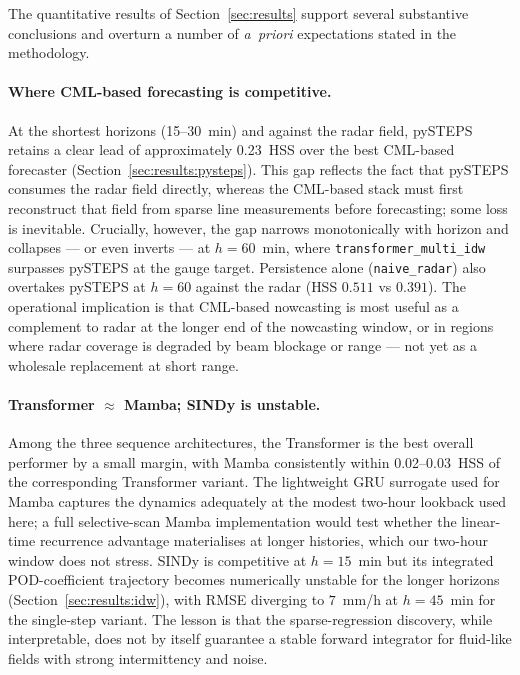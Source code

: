 \documentclass[12pt, a4paper]{article}
\begin{document}
The quantitative results of Section~\ref{sec:results} support several
substantive conclusions and overturn a number of \emph{a~priori}
expectations stated in the methodology.

\paragraph{Where CML-based forecasting is competitive.}
At the shortest horizons (15--30~min) and against the radar field,
pySTEPS retains a clear lead of approximately 0.23~HSS over the best
CML-based forecaster (Section~\ref{sec:results:pysteps}). This gap
reflects the fact that pySTEPS consumes the radar field directly,
whereas the CML-based stack must first reconstruct that field from
sparse line measurements before forecasting; some loss is inevitable.
Crucially, however, the gap narrows monotonically with horizon and
collapses --- or even inverts --- at $h\!=\!60$~min, where
\texttt{transformer\_multi\_idw} surpasses pySTEPS at the
gauge target. Persistence alone (\texttt{naive\_radar}) also overtakes
pySTEPS at $h\!=\!60$ against the radar (HSS $0.511$ vs $0.391$). The
operational implication is that CML-based nowcasting is most useful
as a complement to radar at the longer end of the nowcasting window,
or in regions where radar coverage is degraded by beam blockage or
range --- not yet as a wholesale replacement at short range.

\paragraph{Transformer $\approx$ Mamba; SINDy is unstable.}
Among the three sequence architectures, the Transformer is the best
overall performer by a small margin, with Mamba consistently within
0.02--0.03~HSS of the corresponding Transformer variant. The
lightweight GRU surrogate used for Mamba captures the dynamics
adequately at the modest two-hour lookback used here; a full
selective-scan Mamba implementation would test whether the
linear-time recurrence advantage materialises at longer histories,
which our two-hour window does not stress. SINDy is competitive at
$h\!=\!15$~min but its integrated POD-coefficient trajectory becomes
numerically unstable for the longer horizons
(Section~\ref{sec:results:idw}), with RMSE diverging to $7$~mm/h at
$h\!=\!45$~min for the single-step variant. The lesson is that the
sparse-regression discovery, while interpretable, does not by itself
guarantee a stable forward integrator for fluid-like fields with
strong intermittency and noise.
\end{document}
